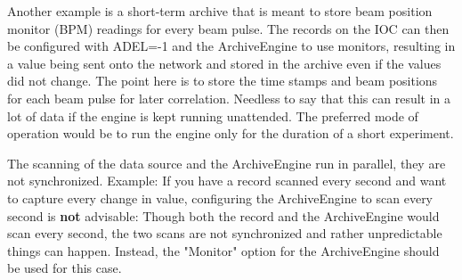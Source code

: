 Another example is a short-term archive that is meant to store
beam position monitor (BPM) readings for every beam pulse. The records
on the IOC can then be configured with ADEL=-1 and the ArchiveEngine
to use monitors, resulting in a value being sent onto the network and
stored in the archive even if the values did not change. The point
here is to store the time stamps and beam positions for each beam
pulse for later correlation. Needless to say that this can result in a
lot of data if the engine is kept running unattended. The preferred
mode of operation would be to run the engine only for the duration
of a short experiment.

\NOTE The scanning of the data source and the ArchiveEngine run in
parallel, they are not synchronized.
Example: If you have a record scanned every second and want to capture
every change in value, configuring the ArchiveEngine to scan every
second is {\bfseries not} advisable:
Though both the record and the ArchiveEngine would scan every
second, the two scans are not synchronized and rather unpredictable
things can happen. Instead, the "Monitor" option for the ArchiveEngine
should be used for this case.

